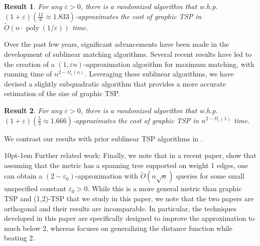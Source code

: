 \documentclass[letterpaper,11pt]{article}
\makeatletter
\renewcommand{\epsilon}{\varepsilon}
\DeclareMathOperator{\poly}{poly}
\newtheorem{result}{Result}
\newenvironment{graytbox}{
\par\addvspace{0.1cm}
\begin{tcolorbox}[width=\textwidth,
                  boxsep=5pt,
                  left=1pt,
                  right=1pt,
                  top=2pt,
                  bottom=2pt,
                  boxrule=0pt,
                  arc=0pt,
                  colback=mylightgray,
                  colframe=black,
                  ]%
}{
\end{tcolorbox}
}
\renewcommand{\paragraph}{%
  \@startsection{paragraph}{4}%
  {\z@}{10pt}{-1em}%
  {\normalfont\normalsize\bfseries}%
}
\makeatother
\begin{document}
\begin{graytbox}
\begin{result}\label{res:graphicTSP}
    For any $\epsilon > 0$, there is a randomized algorithm that w.h.p. $(1+\epsilon)(\frac{11}{6} \approx 1.833)$-approximates the cost of graphic TSP in $\widetilde{O}(n \cdot \poly(1/\epsilon))$ time.
\end{result}
\end{graytbox}


Over the past few years, significant advancements have been made in the development of sublinear matching algorithms. Several recent results \cite{BehnezhadRR23focs, behnezhadroghanirubinstein2022,brrstoc24, BehnezhadRRS-ArXiv22, bhattacharya2023dynamic, sayanSublinear2022} have led to the creation of a $(1, \epsilon n)$-approximation algorithm for maximum matching, with running time of $n^{2-\Omega_{\epsilon}(n)}$. Leveraging these sublinear algorithms, we have devised a slightly subquadratic algorithm that provides a more accurate estimation of the size of graphic TSP.


\begin{graytbox}
\begin{result}\label{res:graphicTSP2}
    For any $\epsilon > 0$, there is a randomized algorithm that w.h.p. $(1+\epsilon)(\frac{5}{3} \approx 1.666)$-approximates the cost of graphic TSP in $n^{2-\Omega_{\epsilon}(1)}$ time.
\end{result}
\end{graytbox}

We contrast our results with prior sublinear TSP algorithms in .


\paragraph{Further related work:} Finally, we note that in a recent paper, \citet*{ChenMetric-Arxiv22} show that assuming that the metric has a spanning tree supported on weight 1 edges, one can obtain a $(2-\epsilon_0)$-approximation with $\widetilde{O}(n\sqrt{n})$ queries for some small unspecified constant $\epsilon_0 > 0$. While this is a more general metric than graphic TSP and (1,2)-TSP that we study in this paper, we note that the two papers are orthogonal and their results are incomparable. In particular, the techniques developed in this paper are specifically designed to improve the approximation to much below 2, whereas \cite{ChenMetric-Arxiv22} focuses on generalizing the distance function while beating 2.
\end{document}
